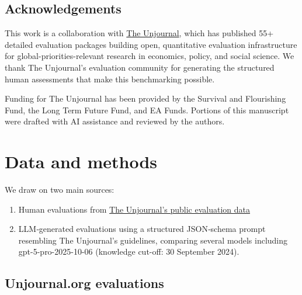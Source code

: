 \documentclass[
  11pt,
  letterpaper,
  DIV=11,
  numbers=noendperiod]{scrreprt}
\providecommand{\tightlist}{%
  \setlength{\itemsep}{0pt}\setlength{\parskip}{0pt}}
\begin{document}
\section{Acknowledgements}\label{acknowledgements}

This work is a collaboration with \href{https://unjournal.org}{The
Unjournal}, which has published 55+ detailed evaluation packages
building open, quantitative evaluation infrastructure for
global-priorities-relevant research in economics, policy, and social
science. We thank The Unjournal's evaluation community for generating
the structured human assessments that make this benchmarking possible.

Funding for The Unjournal has been provided by the Survival and
Flourishing Fund, the Long Term Future Fund, and EA Funds. Portions of
this manuscript were drafted with AI assistance and reviewed by the
authors.


\chapter{Data and methods}\label{data-and-methods}

We draw on two main sources:

\begin{enumerate}
\def\labelenumi{\arabic{enumi})}
\tightlist
\item
  Human evaluations from
  \href{https://unjournal.github.io/unjournaldata/index.html}{The
  Unjournal's public evaluation data}
\item
  LLM‑generated evaluations using a structured JSON‑schema prompt
  resembling The Unjournal's guidelines, comparing several models
  including gpt-5-pro-2025-10-06 (knowledge cut-off: 30 September 2024).
\end{enumerate}

\section{Unjournal.org evaluations}\label{unjournal.org-evaluations}
\end{document}
